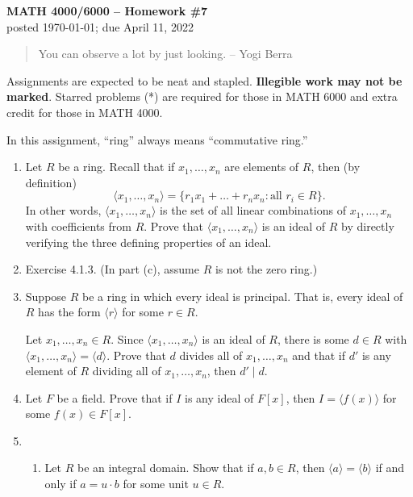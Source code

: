 \documentclass[11pt]{article}
\theoremstyle{plain}
\theoremstyle{remark}
\begin{document}
\thispagestyle{empty} \begin{center} {\textbf{MATH 4000/6000 --
Homework \#7}\\ posted \today; due April 11, 2022}
\end{center}

\begin{quote}{\scriptsize You can observe a lot by just looking. -- Yogi Berra }
\end{quote}

\noindent Assignments are expected to be neat and stapled. \textbf{Illegible work may not be marked}. Starred problems (*) are required for those in MATH 6000 and extra credit for those in MATH 4000.

\vskip 0.1in
\noindent In this assignment, ``ring'' always means ``commutative ring.''
\begin{enumerate}

\item\label{ex:FGideal} Let $R$ be a ring. Recall that if $x_1,\dots, x_n$ are elements of $R$, then (by definition)
\[ \langle x_1, \dots, x_n \rangle = \{r_1 x_1 +\dots + r_n x_n: \text{all $r_i \in R$}\}. \]
In other words, $\langle x_1,\dots,x_n\rangle$ is the set of all linear combinations of $x_1,\dots,x_n$ with coefficients from $R$. Prove that $\langle x_1,\dots,x_n\rangle$ is an ideal of $R$ by directly verifying the three defining properties of an ideal.

\item Exercise 4.1.3. (In part (c), assume $R$ is not the zero ring.)

\item Suppose $R$ be a ring in which every ideal is principal. That is, every ideal of $R$ has the form $\langle r\rangle$ for some $r \in R$.

Let $x_1, \dots, x_n \in R$. Since $\langle x_1,\dots,x_n\rangle$ is an ideal of $R$, there is some $d \in R$ with $\langle x_1,\dots,x_n\rangle = \langle d\rangle$. Prove that $d$ divides all of $x_1,\dots,x_n$ and that if $d'$ is any element of $R$ dividing all of $x_1,\dots,x_n$, then $d' \mid d$.


\item Let $F$ be a field. Prove that if $I$ is any ideal of $F[x]$, then $I = \langle f(x)\rangle$ for some $f(x) \in F[x]$. 



\item
\begin{enumerate}
\item Let $R$ be an integral domain. Show that if $a, b \in R$, then $\langle a\rangle = \langle b\rangle$ if and only if $a=u\cdot b$ for some unit $u \in R$. 
    

\end{enumerate}
\end{enumerate}
\end{document}

